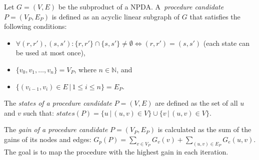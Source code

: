             Let $G = (V, E)$ be the subproduct of a NPDA. A~\textit{procedure candidate} $P = (V_P, E_P)$ is defined as an acyclic linear subgraph of $G$ that satisfies the following conditions:
            \begin{itemize}
                \item $\forall (r, r'), (s, s'): \{r, r'\} \cap \{s, s'\} \neq \emptyset \iff (r, r') = (s, s')$ (each state can be used at most once),
                \item $\{v_0, v_1, \dots, v_n\} = V_P$, where $n \in \mathbb{N}$, and
                \item $\{(v_{i-1}, v_i) \in E\,|\, 1 \leq i \leq n\} = E_P$.
            \end{itemize}

            The \textit{states of a procedure candidate} $P = (V, E)$ are defined as the set of all $u$ and $v$ such that: $states(P) = \{u\,|\, (u, v) \in V\} \cup \{v\,|\,(u, v) \in V\}$.

            The \textit{gain of a procedure candidate} $P = (V_P, E_P)$ is calculated as the sum of the gains of its nodes and edges:  $G_p(P) = \sum_{v\in V_P}G_v(v) + \sum_{(u, v) \in E_P}G_e(u, v)$. The goal is to map the procedure with the highest gain in each iteration.

